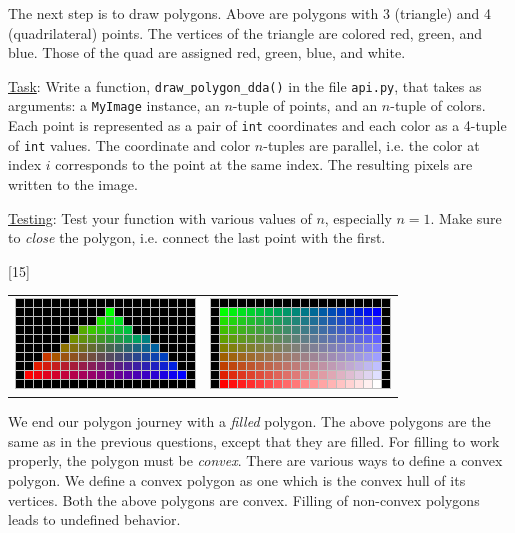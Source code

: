 \documentclass[addpoints]{exam}
\begin{document}
\begin{questions}
  The next step is to draw polygons. Above are polygons with 3 (triangle) and 4 (quadrilateral) points. The vertices of the triangle are colored red, green, and blue. Those of the quad are assigned red, green, blue, and white.
  
  \underline{Task}: Write a function, \texttt{draw\_polygon\_dda()} in the file \texttt{api.py}, that takes as arguments: a \texttt{MyImage} instance, an $n$-tuple of points, and an $n$-tuple of colors. Each point is represented as a pair of \texttt{int} coordinates and each color as a 4-tuple of \texttt{int} values. The coordinate and color $n$-tuples are parallel, i.e. the color at index $i$ corresponds to the point at the same index. The resulting pixels are written to the image.

  \underline{Testing}: Test your function with various values of $n$, especially $n=1$. Make sure to \textit{close} the polygon, i.e. connect the last point with the first.

  [15]

  \begin{center}
    \begin{tabular}{cc}
      \includegraphics[align=t]{tri-fill} & \includegraphics[align=t]{quad-fill}
    \end{tabular}
  \end{center}

  We end our polygon journey with a \textit{filled} polygon. The above polygons are the same as in the previous questions, except that they are filled. For filling to work properly, the polygon must be \textit{convex}. There are various ways to define a convex polygon. We define a convex polygon as one which is the convex hull of its vertices. Both the above polygons are convex. Filling of non-convex polygons leads to undefined behavior.


\end{questions}
\end{document}

